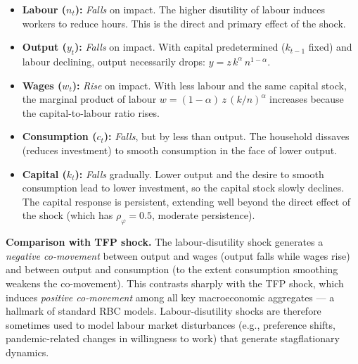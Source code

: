 \documentclass[dvipsnames,11pt]{article}
\begin{document}
\begin{enumerate}
\begin{solution}
                    \begin{itemize}
                        \item \textbf{Labour ($n_t$):} \emph{Falls} on impact.  The higher disutility of labour induces workers to reduce hours.  This is the direct and primary effect of the shock.
                    
                        \item \textbf{Output ($y_t$):} \emph{Falls} on impact.  With capital predetermined ($k_{t-1}$ fixed) and labour declining, output necessarily drops: $y = z\,k^{\alpha}\,n^{1-\alpha}$.
                    
                        \item \textbf{Wages ($w_t$):} \emph{Rise} on impact.  With less labour and the same capital stock, the marginal product of labour $w = (1-\alpha)\,z\,(k/n)^{\alpha}$ increases because the capital-to-labour ratio rises.
                    
                        \item \textbf{Consumption ($c_t$):} \emph{Falls}, but by less than output.  The household dissaves (reduces investment) to smooth consumption in the face of lower output.  
                    
                        \item \textbf{Capital ($k_t$):} \emph{Falls} gradually.  Lower output and the desire to smooth consumption lead to lower investment, so the capital stock slowly declines.  The capital response is persistent, extending well beyond the direct effect of the shock (which has $\rho_{\varphi}=0.5$, moderate persistence).
                    \end{itemize}
                    
                    \textbf{Comparison with TFP shock.}
                    The labour-disutility shock generates a \emph{negative co-movement} between output and wages (output falls while wages rise) and between output and consumption (to the extent consumption smoothing weakens the co-movement).  This contrasts sharply with the TFP shock, which induces \emph{positive co-movement} among all key macroeconomic aggregates — a hallmark of standard RBC models.  Labour-disutility shocks are therefore sometimes used to model labour market disturbances (e.g., preference shifts, pandemic-related changes in willingness to work) that generate stagflationary dynamics.
                    
                \end{solution}
        
        \end{enumerate}

\printbibliography
\end{document}
